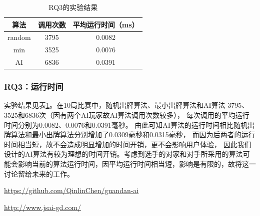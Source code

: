 \documentclass[a4paper]{ctexart}
\begin{document}
\begin{table}
	\centering
	\caption{RQ3的实验结果}
	\label{RQ3_result}
	\begin{tabular}{|c|c|c|}
		\hline
		算法 & 调用次数 & 平均运行时间（ms） \\ \hline
		random & 3795 & 0.0082 \\ \hline
		min & 3525 & 0.0076 \\ \hline
		AI & 6836 & 0.0391 \\ \hline
	\end{tabular}
\end{table}


\subsubsection{RQ3：运行时间}

实验结果见表\ref{RQ3_result}。在10局比赛中，随机出牌算法、最小出牌算法和AI算法
3795、3525和6836次（因有两个AI玩家故AI算法调用次数较多），
每次调用的平均运行时间分别为0.0082、0.0076和0.0391毫秒。
由此可知AI算法的运行时间相比随机出牌算法和最小出牌算法分别增加了0.0309毫秒和0.0315毫秒，
而因为后两者的运行时间相当短，故不会造成明显增加的时间开销，更不会影响用户体验，
因此我们设计的AI算法有较为理想的时间开销。考虑到选手的对家和对手所采用的算法可能会影响当前的算法运行时间，因平均运行时间相当短，影响是有限的，故将这一讨论留给未来的工作。

\begin{thebibliography}{99}
  \url{https://github.com/QinlinChen/guandan-ai}

  \url{http://www.jsai-gd.com/}
\end{thebibliography}
\end{document}
